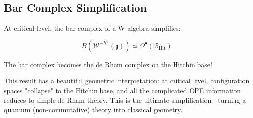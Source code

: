 \subsection{Bar Complex Simplification}

\begin{theorem}
\label{thm:w-algebra-bar-critical}
At critical level, the bar complex of a W-algebra simplifies:

$$\bar{B}(\mathcal{W}^{-h^{\vee}}(\mathfrak{g})) \simeq \Omega^{\bullet}(\mathcal{B}_{\text{Hit}})$$

The bar complex becomes the de Rham complex on the Hitchin base!
\end{theorem}

\begin{remark}
This result has a beautiful geometric interpretation: at critical level, configuration 
spaces "collapse" to the Hitchin base, and all the complicated OPE information reduces 
to simple de Rham theory. This is the ultimate simplification - turning a quantum 
(non-commutative) theory into classical geometry.
\end{remark}

